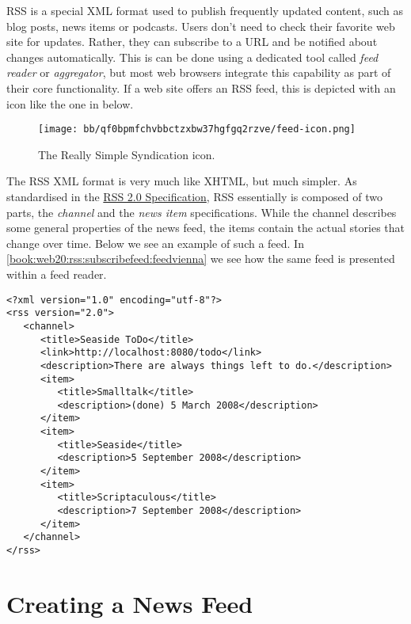 \documentclass[a4paper,10pt,twoside]{book}
\begin{document}
 RSS is a special XML format used to publish frequently updated content, such as blog posts, news items or podcasts. Users don't need to check their favorite web site for updates. Rather, they can subscribe to a URL and be notified about changes automatically. This is can be done using a dedicated tool called \textit{feed reader} or \textit{aggregator}, but most web browsers integrate this capability as part of their core functionality. If a web site offers an RSS feed, this is depicted with an icon like the one in below.

\begin{figure}[h!tbp]
	\begin{center}
		\texttt{[image: bb/qf0bpmfchvbbctzxbw37hgfgq2rzve/feed-icon.png]}
		\caption{The Really Simple Syndication icon.\label{book:web20:rss:rsslogo}}
	\end{center}
\end{figure}


The RSS XML format is very much like XHTML, but much simpler. As standardised in the \href{http://cyber.law.harvard.edu/rss/rss.html}{RSS 2.0 Specification}, RSS essentially is composed of two parts, the \textit{channel} and the \textit{news item} specifications. While the channel describes some general properties of the news feed, the items contain the actual stories that change over time. Below we see an example of such a feed. In \autoref{book:web20:rss:subscribefeed:feedvienna} we see how the same feed is presented within a feed reader.

\begin{lstlisting}
<?xml version="1.0" encoding="utf-8"?>
<rss version="2.0">
   <channel>
      <title>Seaside ToDo</title>
      <link>http://localhost:8080/todo</link>
      <description>There are always things left to do.</description>
      <item>
         <title>Smalltalk</title>
         <description>(done) 5 March 2008</description>
      </item>
      <item>
         <title>Seaside</title>
         <description>5 September 2008</description>
      </item>
      <item>
         <title>Scriptaculous</title>
         <description>7 September 2008</description>
      </item>
   </channel>
</rss>
\end{lstlisting}

\section{Creating a News Feed}
\label{book:web20:rss:createfeed}
\end{document}
